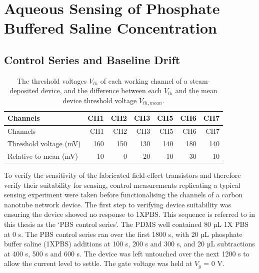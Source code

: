 \documentclass[
  a4paper,
]{scrbook}
\begin{document}
\hypertarget{sec-dummy-sensing}{%
\section{Aqueous Sensing of Phosphate Buffered Saline
Concentration}\label{sec-dummy-sensing}}

\hypertarget{sec-baseline-drift}{%
\subsection{Control Series and Baseline
Drift}\label{sec-baseline-drift}}

\hypertarget{tbl-threshold-voltages}{}
\begin{longtable}[]{@{}lrrrrrr@{}}
\caption{\label{tbl-threshold-voltages}The threshold voltages \(V_{th}\)
of each working channel of a steam-deposited device, and the difference
between each \(V_{th}\) and the mean device threshold voltage
\(V_{th, mean}\).\\
}\tabularnewline
\toprule\noalign{}
Channels & CH1 & CH2 & CH3 & CH5 & CH6 & CH7 \\
\midrule\noalign{}
\endfirsthead
\toprule\noalign{}
Channels & CH1 & CH2 & CH3 & CH5 & CH6 & CH7 \\
\midrule\noalign{}
\endhead
\bottomrule\noalign{}
\endlastfoot
Threshold voltage (mV) & 160 & 150 & 130 & 140 & 180 & 140 \\
Relative to mean (mV) & 10 & 0 & -20 & -10 & 30 & -10 \\
\end{longtable}

To verify the sensitivity of the fabricated field-effect transistors and
therefore verify their suitability for sensing, control measurements
replicating a typical sensing experiment were taken before
functionalising the channels of a carbon nanotube network device. The
first step to verifying device suitability was ensuring the device
showed no response to 1XPBS. This sequence is referred to in this thesis
as the `PBS control series'. The PDMS well contained 80 µL 1X PBS at 0
s. The PBS control series ran over the first 1800 s, with 20 µL
phosphate buffer saline (1XPBS) additions at 100 s, 200 s and 300 s, and
20 µL subtractions at 400 s, 500 s and 600 s. The device was left
untouched over the next 1200 s to allow the current level to settle. The
gate voltage was held at \(V_g\) = 0 V.
\end{document}
